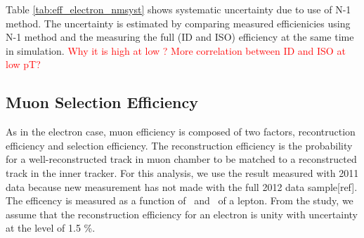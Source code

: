 Table \ref{tab:eff_electron_nmsyst} shows systematic uncertainty due to use of N-1 method. 
The uncertainty is estimated by comparing measured efficienicies using N-1 method and 
the measuring the full (ID and ISO) efficiency at the same time in simulation. 
\textcolor{red}{Why it is high at low \pt? More correlation between ID and ISO at 
low pT?}

\subsection{Muon Selection Efficiency}

As in the electron case, muon efficiency is composed of two factors, 
recontruction efficiency and selection efficiency. 
The reconstruction efficiency is the probability for a 
well-reconstructed track in muon chamber to be matched to a reconstructed track 
in the inner tracker. For this analysis, we use the result measured with 2011 data   
because new measurement has not made with the full 2012 data sample[ref]. 
The efficency is measured as a function 
of \pt~and \Eta~of a lepton. From the study, we assume that the reconstruction 
efficiency for an electron is unity with uncertainty at the level of 1.5 \%.

